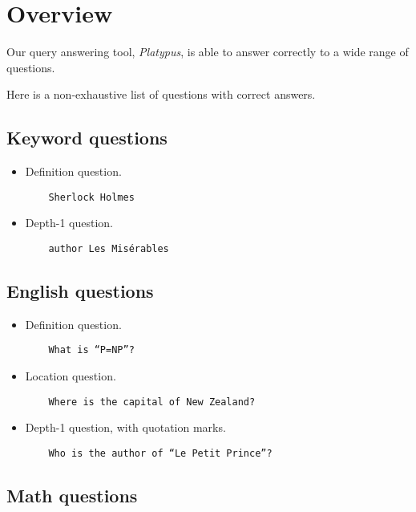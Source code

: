 \section{Overview}

Our query answering tool, \emph{Platypus}, is able to answer correctly to a wide range
of questions.

Here is a non-exhaustive list of questions with correct answers.

\subsection{Keyword questions}

\begin{itemize}
    \item Definition question.
    \begin{verbatim}
    Sherlock Holmes
    \end{verbatim}

    \item Depth-1 question.
    \begin{verbatim}
    author Les Misérables
    \end{verbatim}
\end{itemize}

\subsection{English questions}

\begin{itemize}
    \item Definition question.
    \begin{verbatim}
    What is “P=NP”?
    \end{verbatim}

    \item Location question.
    \begin{verbatim}
    Where is the capital of New Zealand?
    \end{verbatim}

    \item Depth-1 question, with quotation marks.
    \begin{verbatim}
    Who is the author of “Le Petit Prince”?
    \end{verbatim}
\end{itemize}

\subsection{Math questions}

